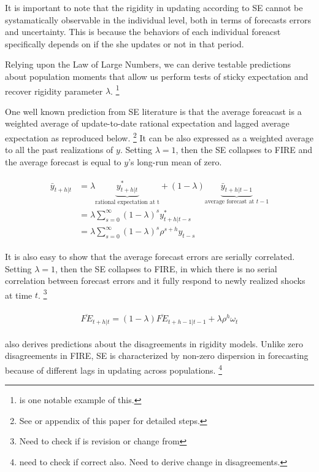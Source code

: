 \documentclass[]{article}
\begin{document}
It is important to note that the rigidity in updating according to SE cannot be systamatically observable in the individual level, both in terms of forecasts errors and uncertainty. This is because the behaviors of each individual foreacst specifically depends on if the she updates or not in that period. 

Relying upon the Law of Large Numbers, we can derive testable predictions about population moments that allow us perform tests of sticky expectation and recover rigidity parameter $\lambda$. \footnote{\citet{carroll2003macroeconomic} is one notable example of this.} 
	

One well known prediction from SE literature is that the average foreacast is a weighted average of update-to-date rational expectation and lagged average expectation as reproduced below. \footnote{See \citet{coibion2012can} or appendix of this paper for detailed steps.} It can be also expressed as a weighted average to all the past realizations of $y$. Setting $\lambda=1$, then the SE collapses to FIRE and the average forecast is equal to $y$'s long-run mean of zero.

\begin{eqnarray}
\begin{aligned}
\bar y_{t+h|t} & = \lambda \underbrace{y^*_{t+h|t}}_{\textrm{rational expectation at t}} + (1-\lambda) \underbrace{\bar y_{t+h|t-1}}_{\textrm{average forecast at } t-1} \\
& = \lambda \sum^{\infty}_{s=0} (1-\lambda)^s y^*_{t+h|t-s} \\
& = \lambda \sum^{\infty}_{s=0} (1-\lambda)^s \rho^{s+h}y_{t-s}
\end{aligned}
\end{eqnarray}

It is also easy to show that the average forecast errors are serially correlated. Setting $\lambda=1$, then the SE collapses to FIRE, in which there is no serial correlation between forecast errors and it fully respond to newly realized shocks at time $t$.  \footnote{Need to check if is revision or change from}

\begin{eqnarray}
\begin{aligned}
\overline{FE}_{t+h|t}  = (1-\lambda) \overline {FE}_{t+h-1|t-1} + \lambda \rho^h \omega_t 
\end{aligned}
\end{eqnarray}


\citet{coibion2012can} also derives predictions about the disagreements in rigidity models. Unlike zero disagreements in FIRE, SE is characterized by non-zero dispersion in forecasting because of different lags in updating across populations. \footnote{need to check if correct also. Need to derive change in disagreements.} 
\end{document}
